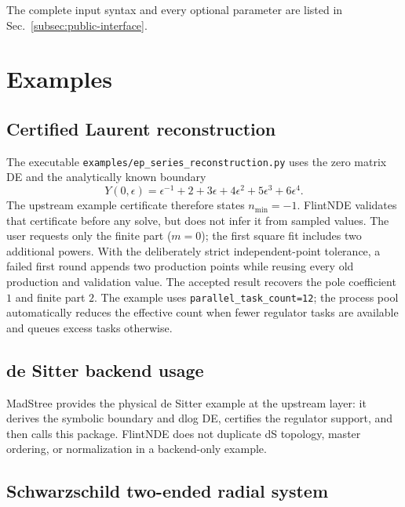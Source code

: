 \documentclass[11pt]{article}
\begin{document}
The complete input syntax and every optional parameter are listed in
Sec.~\ref{subsec:public-interface}.

\section{Examples}
\label{sec:examples}

\subsection{Certified Laurent reconstruction}

The executable \texttt{examples/ep\_series\_reconstruction.py} uses the zero matrix DE and
the analytically known boundary
\begin{equation}
 Y(0,\epsilon)=\epsilon^{-1}+2+3\epsilon+4\epsilon^2+5\epsilon^3+6\epsilon^4.
\end{equation}
The upstream example certificate therefore states $n_{\min}=-1$.  FlintNDE validates that
certificate before any solve, but does not infer it from sampled values.  The user requests only
the finite part ($m=0$); the first square fit includes two additional powers.  With the deliberately
strict independent-point tolerance, a failed first round appends two production points while
reusing every old production and validation value.  The accepted result recovers the pole
coefficient $1$ and finite part $2$.  The example uses
\texttt{parallel\_task\_count=12}; the process pool automatically reduces the effective count
when fewer regulator tasks are available and queues excess tasks otherwise.

\subsection{de Sitter backend usage}

MadStree provides the physical de Sitter example at the upstream layer: it derives the symbolic
boundary and dlog DE, certifies the regulator support, and then calls this package.  FlintNDE does
not duplicate dS topology, master ordering, or normalization in a backend-only example.

\subsection{Schwarzschild two-ended radial system}
\label{subsec:qnm-example}
\end{document}
